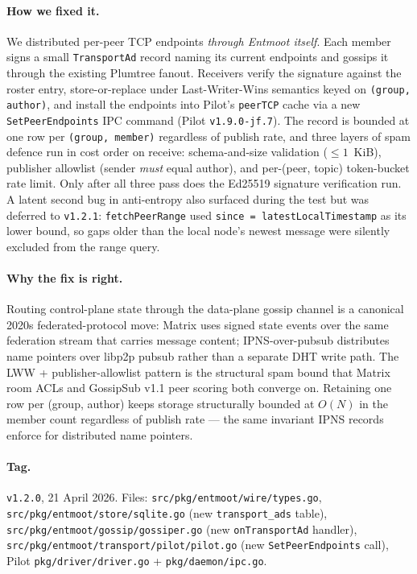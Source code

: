 \documentclass[11pt,a4paper]{article}
\begin{document}
\paragraph{How we fixed it.} We distributed per-peer TCP
endpoints \emph{through Entmoot itself}. Each member signs a
small \texttt{TransportAd} record naming its current endpoints
and gossips it through the existing Plumtree fanout. Receivers
verify the signature against the roster entry, store-or-replace
under Last-Writer-Wins semantics keyed on
\texttt{(group, author)}, and install the endpoints into Pilot's
\texttt{peerTCP} cache via a new \texttt{SetPeerEndpoints} IPC
command (Pilot \texttt{v1.9.0-jf.7}). The record is bounded at
one row per \texttt{(group, member)} regardless of publish rate,
and three layers of spam defence run in cost order on receive:
schema-and-size validation ($\le 1$~KiB), publisher allowlist
(sender \emph{must} equal author), and per-(peer, topic)
token-bucket rate limit. Only after all three pass does the
Ed25519 signature verification run. A latent second bug in
anti-entropy also surfaced during the test but was deferred to
\texttt{v1.2.1}: \texttt{fetchPeerRange} used
\texttt{since = latestLocalTimestamp} as its lower bound, so
gaps older than the local node's newest message were silently
excluded from the range query.

\paragraph{Why the fix is right.} Routing control-plane state
through the data-plane gossip channel is a canonical 2020s
federated-protocol move: Matrix uses signed state events over
the same federation stream that carries message content;
IPNS-over-pubsub distributes name pointers over libp2p pubsub
rather than a separate DHT write path. The LWW +
publisher-allowlist pattern is the structural spam bound that
Matrix room ACLs and GossipSub v1.1 peer scoring both converge
on. Retaining one row per (group, author) keeps storage
structurally bounded at $O(N)$ in the member count regardless
of publish rate --- the same invariant IPNS records enforce
for distributed name pointers.

\paragraph*{Tag.} \texttt{v1.2.0}, 21 April 2026. Files:
\texttt{src/pkg/entmoot/wire/types.go},
\texttt{src/pkg/entmoot/store/sqlite.go} (new
\texttt{transport\_ads} table),
\texttt{src/pkg/entmoot/gossip/gossiper.go} (new
\texttt{onTransportAd} handler),
\texttt{src/pkg/entmoot/transport/pilot/pilot.go} (new
\texttt{SetPeerEndpoints} call), Pilot
\texttt{pkg/driver/driver.go} + \texttt{pkg/daemon/ipc.go}.
\end{document}
